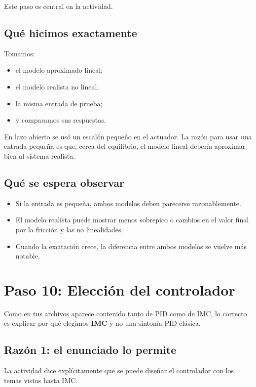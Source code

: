 \documentclass[11pt]{article}
\begin{document}
Este paso es central en la actividad.

\subsection{Qu\'e hicimos exactamente}

Tomamos:

\begin{itemize}[leftmargin=1.2cm]
\item el modelo aproximado lineal;
\item el modelo realista no lineal;
\item la misma entrada de prueba;
\item y comparamos sus respuestas.
\end{itemize}

En lazo abierto se us\'o un escal\'on peque\~no en el actuador. La raz\'on para usar una entrada peque\~na es que, cerca del equilibrio, el modelo lineal deber\'ia aproximar bien al sistema realista.

\subsection{Qu\'e se espera observar}

\begin{itemize}[leftmargin=1.2cm]
\item Si la entrada es peque\~na, ambos modelos deben parecerse razonablemente.
\item El modelo realista puede mostrar menos sobrepico o cambios en el valor final por la fricci\'on y las no linealidades.
\item Cuando la excitaci\'on crece, la diferencia entre ambos modelos se vuelve m\'as notable.
\end{itemize}

\section{Paso 10: Elecci\'on del controlador}

Como en tus archivos aparece contenido tanto de PID como de IMC, lo correcto es explicar por qu\'e elegimos \textbf{IMC} y no una sinton\'ia PID cl\'asica.

\subsection{Raz\'on 1: el enunciado lo permite}

La actividad dice expl\'icitamente que se puede dise\~nar el controlador con los temas vistos hasta IMC.
\end{document}
